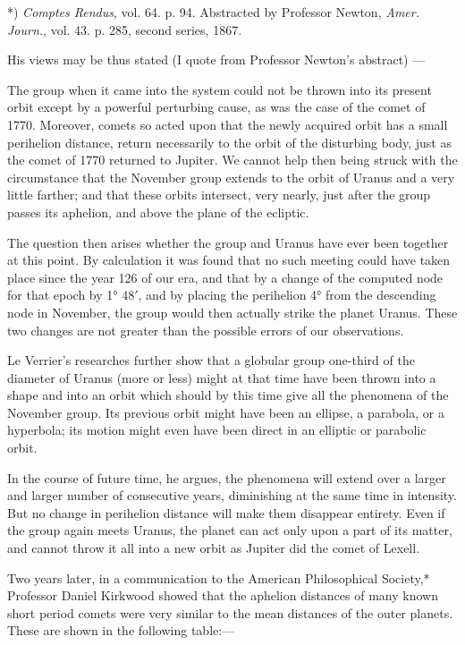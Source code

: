 \documentclass[a4paper, 12pt, oneside, polutonikogreek, english]{article}
\begin{document}
*) \emph{Comptes Rendus}, vol. 64. p. 94. Abstracted by Professor Newton, \emph{Amer. Journ.}, vol. 43. p. 285, second series, 1867.

His views may be thus stated (I quote from Professor Newton's abstract) ---

The group when it came into the system could not be thrown into its present orbit except by a powerful perturbing cause, as was the case of the comet of 1770. Moreover, comets so acted upon that the newly acquired orbit has a small perihelion distance, return necessarily to the orbit of the disturbing body, just as the comet of 1770 returned to Jupiter. We cannot help then being struck with the circumstance that the November group extends to the orbit of Uranus and a very little farther; and that these orbits intersect, very nearly, just after the group passes its aphelion, and above the plane of the ecliptic.

The question then arises whether the group and Uranus have ever been together at this point. By calculation it was found that no such meeting could have taken place since the year 126 of our era, and that by a change of the computed node for that epoch by 1° 48$\prime$, and by placing the perihelion 4° from the descending node in November, the group would then actually strike the planet Uranus. These two changes are not greater than the possible errors of our observations.

Le Verrier's researches further show that a globular group one-third of the diameter of Uranus (more or less) might at that time have been thrown into a shape and into an orbit which should by this time give all the phenomena of the November group. Its previous orbit might have been an ellipse, a parabola, or a hyperbola; its motion might even have been direct in an elliptic or parabolic orbit.

In the course of future time, he argues, the phenomena will extend over a larger and larger number of consecutive years, diminishing at the same time in intensity. But no change in perihelion distance will make them disappear entirety. Even if the group again meets Uranus, the planet can act only upon a part of its matter, and cannot throw it all into a new orbit as Jupiter did the comet of Lexell.

Two years later, in a communication to the American Philosophical Society,* Professor Daniel Kirkwood showed that the aphelion distances of many known short period comets were very similar to the mean distances of the outer planets. These are shown in the following table:---
\end{document}
